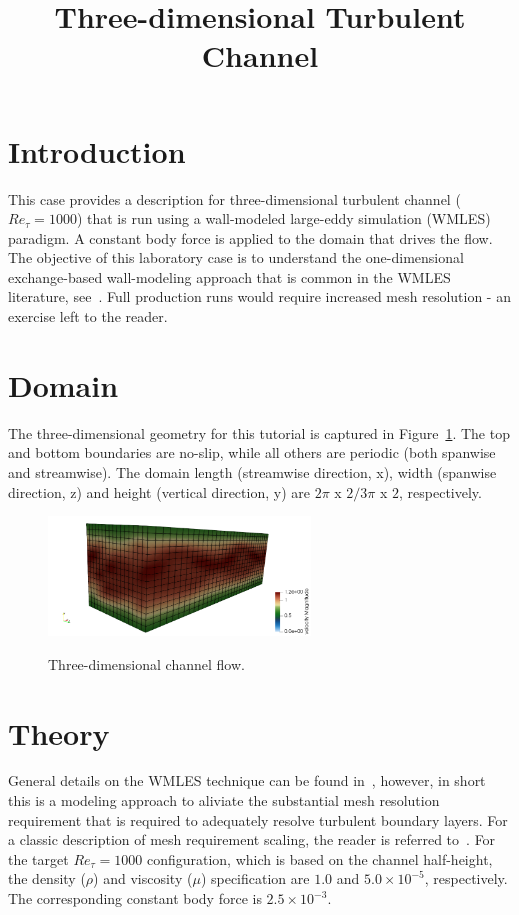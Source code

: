 \documentclass{article}
\title{Three-dimensional Turbulent Channel}
\date{}
\begin{document}
\maketitle

\section{Introduction}
This case provides a description for three-dimensional turbulent channel 
($Re_\tau = 1000$) that is run using a wall-modeled large-eddy simulation (WMLES) paradigm.
A constant body force is applied to the domain that drives the flow. The objective 
of this laboratory case is to understand the one-dimensional exchange-based
wall-modeling approach that is common in the WMLES literature, see~\cite{larsson2016}.
Full production runs would require increased mesh resolution - an exercise left to the
reader.

\section{Domain}
The three-dimensional geometry for this tutorial is captured in Figure~\ref{fig:geom}. 
The top and bottom boundaries are no-slip, while all others are periodic (both spanwise
and streamwise). The domain length (streamwise direction, x), width (spanwise direction, z) and
height (vertical direction, y) are $2\pi$ \!x $2/3\pi$ \!x $2$, respectively.

\begin{figure}[!htbp]
  \centering
  {
   \includegraphics[height=1.25in]{images/3d_hex8_turb_channel_geom.png}
  }
  \caption{Three-dimensional channel flow.}
  \label{fig:geom}
\end{figure}

\section{Theory}
General details on the WMLES technique can be found in~\cite{larsson2016}, however, in short
this is a modeling approach to aliviate the substantial mesh resolution requirement that is
required to adequately resolve turbulent boundary layers. For a classic description of 
mesh requirement scaling, the reader is referred to~\cite{chapman}. For the 
target $Re_\tau = 1000$ configuration, which is based on the channel half-height, the density ($\rho$) 
and viscosity ($\mu$) specification are $1.0$ and $5.0 \times 10^{-5}$, respectively. The corresponding
constant body force is $2.5 \times 10^{-3}$. 
\end{document}
